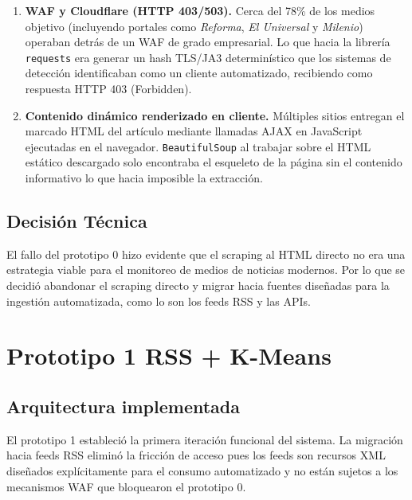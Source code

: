 \begin{enumerate}
    \item \textbf{WAF y Cloudflare (HTTP 403/503).} Cerca del 78\% de los medios objetivo
          (incluyendo portales como \textit{Reforma}, \textit{El Universal} y \textit{Milenio})
          operaban detrás de un WAF de grado empresarial. Lo que hacia la librería \texttt{requests}
          era generar un hash TLS/JA3 determinístico que los sistemas de detección identificaban
          como un cliente automatizado, recibiendo como respuesta HTTP 403 (Forbidden).

    \item \textbf{Contenido dinámico renderizado en cliente.} Múltiples sitios
          entregan el marcado HTML del artículo mediante llamadas AJAX en JavaScript
          ejecutadas en el navegador. \texttt{BeautifulSoup} al trabajar sobre el
          HTML estático descargado solo encontraba el esqueleto de la página sin
          el contenido informativo lo que hacia imposible la extracción.
\end{enumerate}

\subsection{Decisión Técnica}
\label{subsec:p0_leccion}

El fallo del prototipo 0 hizo evidente que el scraping al HTML directo no era una estrategia viable
para el monitoreo de medios de noticias modernos. Por lo que se decidió abandonar el scraping directo
y migrar hacia fuentes diseñadas para la ingestión automatizada, como lo son los feeds RSS y las APIs.

\section{Prototipo 1 RSS + K-Means}
\label{sec:p1_baseline}

\subsection{Arquitectura implementada}
\label{subsec:p1_arquitectura}

El prototipo 1 estableció la primera iteración funcional del sistema. La migración hacia
feeds RSS eliminó la fricción de acceso pues los feeds son recursos XML diseñados
explícitamente para el consumo automatizado y no están sujetos a los mecanismos WAF
que bloquearon el prototipo 0.

